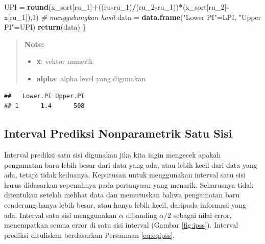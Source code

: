 \documentclass[]{book}
\newenvironment{Shaded}{\begin{snugshade}}{\end{snugshade}}
\newcommand{\KeywordTok}[1]{\textcolor[rgb]{0.13,0.29,0.53}{\textbf{#1}}}
\newcommand{\DataTypeTok}[1]{\textcolor[rgb]{0.13,0.29,0.53}{#1}}
\newcommand{\DecValTok}[1]{\textcolor[rgb]{0.00,0.00,0.81}{#1}}
\newcommand{\FloatTok}[1]{\textcolor[rgb]{0.00,0.00,0.81}{#1}}
\newcommand{\StringTok}[1]{\textcolor[rgb]{0.31,0.60,0.02}{#1}}
\newcommand{\CommentTok}[1]{\textcolor[rgb]{0.56,0.35,0.01}{\textit{#1}}}
\newcommand{\OperatorTok}[1]{\textcolor[rgb]{0.81,0.36,0.00}{\textbf{#1}}}
\newcommand{\NormalTok}[1]{#1}
\providecommand{\tightlist}{%
  \setlength{\itemsep}{0pt}\setlength{\parskip}{0pt}}
\begin{document}
\begin{Shaded}
\begin{Highlighting}[]
\NormalTok{  UPI =}\StringTok{ }\KeywordTok{round}\NormalTok{(x_sort[ru_}\DecValTok{1}\NormalTok{]}\OperatorTok{+}\NormalTok{((ru}\OperatorTok{-}\NormalTok{ru_}\DecValTok{1}\NormalTok{)}\OperatorTok{/}\NormalTok{(ru_}\DecValTok{2}\OperatorTok{-}\NormalTok{ru_}\DecValTok{1}\NormalTok{))}\OperatorTok{*}\NormalTok{(x_sort[ru_}\DecValTok{2}\NormalTok{]}\OperatorTok{-}\NormalTok{x[ru_}\DecValTok{1}\NormalTok{]),}\DecValTok{1}\NormalTok{)}
  \CommentTok{# menggabungkan hasil}
\NormalTok{  data =}\StringTok{ }\KeywordTok{data.frame}\NormalTok{(}\StringTok{"Lower PI"}\NormalTok{=LPI,}
                    \StringTok{"Upper PI"}\NormalTok{=UPI)}
  \KeywordTok{return}\NormalTok{(data)}
\NormalTok{\}}
\end{Highlighting}
\end{Shaded}

\begin{quote}
\textbf{Note: }

\begin{itemize}
\tightlist
\item
  \textbf{x}: vektor numerik
\item
  \textbf{alpha}: alpha level yang digunakan
\end{itemize}
\end{quote}

\begin{Shaded}
\end{Shaded}

\begin{verbatim}
##   Lower.PI Upper.PI
## 1      1.4      508
\end{verbatim}

\subsection{Interval Prediksi Nonparametrik Satu
Sisi}\label{interval-prediksi-nonparametrik-satu-sisi}

Interval prediksi satu sisi digunakan jika kita ingin mengecek apakah
pengamatan baru lebih besar dari data yang ada, atau lebih kecil dari
data yang ada, tetapi tidak keduanya. Keputusan untuk menggunakan
interval satu sisi harus didasarkan sepenuhnya pada pertanyaan yang
menarik. Seharusnya tidak ditentukan setelah melihat data dan memutuskan
bahwa pengamatan baru cenderung hanya lebih besar, atau hanya lebih
kecil, daripada informasi yang ada. Interval satu sisi menggunakan
\(\alpha\) dibanding \(\alpha/2\) sebagai nilai error, menempatkan semua
error di satu sisi interval (Gambar \ref{fig:ipss}). Interval prediksi
dituliskan berdasarkan Persamaan \eqref{eq:eqipss}.
\end{document}

